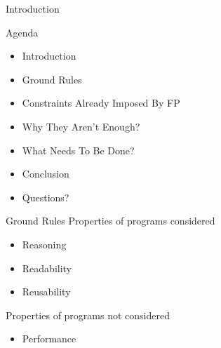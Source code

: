 \begin{section}{Introduction}
\begin{frame}{Agenda}
  \begin{itemize}
  \item Introduction \cite{TMorrisParametricity} \cite{KNuttycombeParametricity}
  \item Ground Rules
  \item Constraints Already Imposed By FP
  \item Why They Aren't Enough?
  \item What Needs To Be Done?
  \item Conclusion
  \item Questions?
  \end{itemize}
\end{frame}

\begin{frame}{Ground Rules}
  Properties of programs considered
  \begin{itemize}
  \item Reasoning
  \item Readability
  \item Reusability
  \end{itemize}
  Properties of programs not considered
  \begin{itemize}
  \item Performance
  \end{itemize}
\end{frame}
\end{section}
